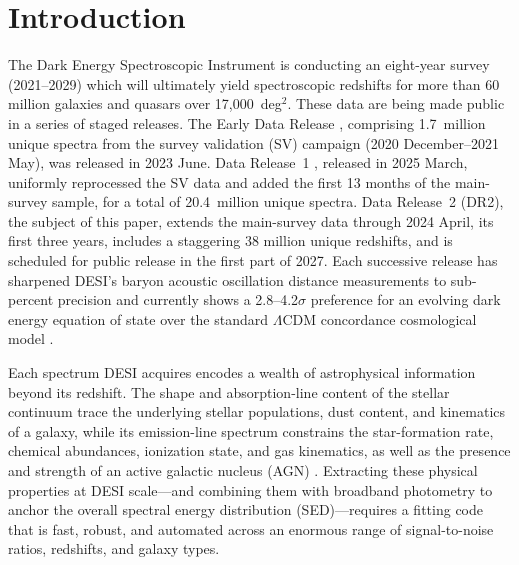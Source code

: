 \documentclass[modern,linenumbers]{aastex701}
\begin{document}
\section{Introduction}
\label{sec:intro}

The Dark Energy Spectroscopic Instrument \citep[DESI;][]{levi13a,
  desi-collaboration16a, desi-collaboration24e} is conducting an
eight-year survey (2021--2029) which will ultimately yield
spectroscopic redshifts for more than 60 million galaxies and quasars
over 17,000~deg$^2$. These data are being made public in a series of
staged releases. The Early Data Release
\citep[EDR;][]{desi-collaboration24d}, comprising 1.7~million unique
spectra from the survey validation (SV) campaign (2020 December--2021
May), was released in 2023 June. Data Release~1
\citep[DR1;][]{desi-collaboration26a}, released in 2025 March,
uniformly reprocessed the SV data and added the first 13 months of the
main-survey sample, for a total of 20.4~million unique spectra. Data
Release~2 (DR2), the subject of this paper, extends the main-survey
data through 2024 April, its first three years, includes a staggering
38 million unique redshifts, and is scheduled for public release in
the first part of 2027. Each successive release has sharpened DESI's
baryon acoustic oscillation distance measurements to sub-percent
precision and currently shows a 2.8--4.2$\sigma$ preference for an
evolving dark energy equation of state over the standard $\Lambda$CDM
concordance cosmological model \citep{adame25b, adame25d, adame25e,
  abdul-karim25a, abdul-karim25b}.

Each spectrum DESI acquires encodes a wealth of astrophysical
information beyond its redshift. The shape and absorption-line content
of the stellar continuum trace the underlying stellar populations,
dust content, and kinematics of a galaxy, while its emission-line
spectrum constrains the star-formation rate, chemical abundances,
ionization state, and gas kinematics, as well as the presence and
strength of an active galactic nucleus (AGN) \citep[and references
  therein]{conroy13a}. Extracting these physical properties at DESI
scale---and combining them with broadband photometry to anchor the
overall spectral energy distribution (SED)---requires a fitting code
that is fast, robust, and automated across an enormous range of
signal-to-noise ratios, redshifts, and galaxy types.
\end{document}
